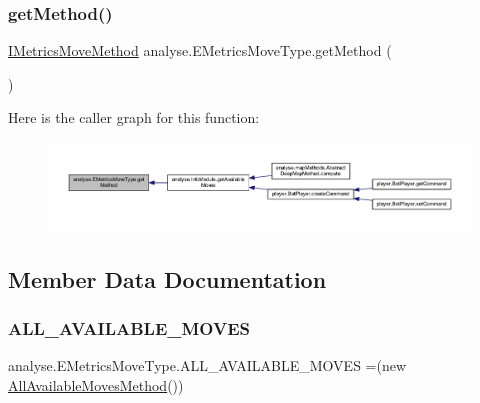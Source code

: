 \subsubsection{\texorpdfstring{get\+Method()}{getMethod()}}
{\footnotesize\ttfamily \mbox{\hyperlink{interfaceanalyse_1_1move_methods_1_1_i_metrics_move_method}{I\+Metrics\+Move\+Method}} analyse.\+E\+Metrics\+Move\+Type.\+get\+Method (\begin{DoxyParamCaption}{ }\end{DoxyParamCaption})\hspace{0.3cm}{\ttfamily [inline]}}

Here is the caller graph for this function\+:
\nopagebreak
\begin{figure}[H]
\begin{center}
\leavevmode
\includegraphics[width=350pt]{enumanalyse_1_1_e_metrics_move_type_aa8970fab2a06f13d314f9fc790c24048_icgraph}
\end{center}
\end{figure}


\subsection{Member Data Documentation}
\mbox{\label{enumanalyse_1_1_e_metrics_move_type_a6648e7e575bb97c1260b51746bc14a5a}} 
\subsubsection{\texorpdfstring{A\+L\+L\+\_\+\+A\+V\+A\+I\+L\+A\+B\+L\+E\+\_\+\+M\+O\+V\+ES}{ALL\_AVAILABLE\_MOVES}}
{\footnotesize\ttfamily analyse.\+E\+Metrics\+Move\+Type.\+A\+L\+L\+\_\+\+A\+V\+A\+I\+L\+A\+B\+L\+E\+\_\+\+M\+O\+V\+ES =(new \mbox{\hyperlink{classanalyse_1_1move_methods_1_1_all_available_moves_method}{All\+Available\+Moves\+Method}}())}

